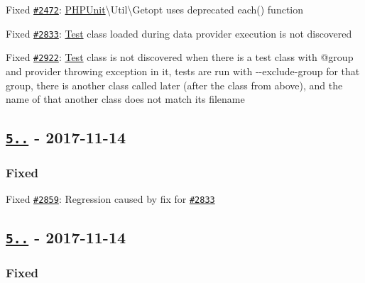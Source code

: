 \begin{DoxyItemize}
\item Fixed \href{https://github.com/sebastianbergmann/phpunit/issues/2472}{\tt \#2472}\+: {\ttfamily \mbox{\hyperlink{namespace_p_h_p_unit}{P\+H\+P\+Unit}}\textbackslash{}Util\textbackslash{}Getopt} uses deprecated {\ttfamily each()} function
\item Fixed \href{https://github.com/sebastianbergmann/phpunit/issues/2833}{\tt \#2833}\+: \mbox{\hyperlink{class_test}{Test}} class loaded during data provider execution is not discovered
\item Fixed \href{https://github.com/sebastianbergmann/phpunit/issues/2922}{\tt \#2922}\+: \mbox{\hyperlink{class_test}{Test}} class is not discovered when there is a test class with {\ttfamily @group} and provider throwing exception in it, tests are run with {\ttfamily -\/-\/exclude-\/group} for that group, there is another class called later (after the class from above), and the name of that another class does not match its filename
\end{DoxyItemize}

\subsection*{\href{https://github.com/sebastianbergmann/phpunit/compare/5.7.24...5.7.25}{\tt 5..} -\/ 2017-\/11-\/14}

\subsubsection*{Fixed}


\begin{DoxyItemize}
\item Fixed \href{https://github.com/sebastianbergmann/phpunit/issues/2859}{\tt \#2859}\+: Regression caused by fix for \href{https://github.com/sebastianbergmann/phpunit/issues/2833}{\tt \#2833}
\end{DoxyItemize}

\subsection*{\href{https://github.com/sebastianbergmann/phpunit/compare/5.7.23...5.7.24}{\tt 5..} -\/ 2017-\/11-\/14}

\subsubsection*{Fixed}


